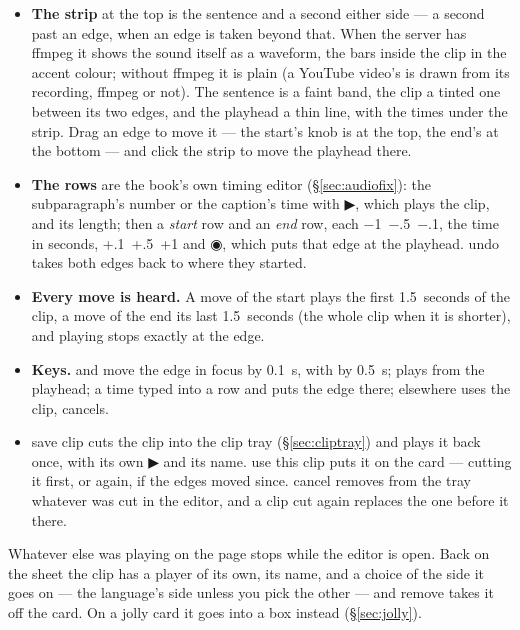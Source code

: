 \documentclass[11pt,oneside]{report}
\newcommand{\sym}[1]{{\symfont #1}}
\newcommand{\key}[1]{\textsf{\small\fbox{#1}}}
\newcommand{\menu}[1]{\textsf{#1}}
\begin{document}
\begin{itemize}
\item \textbf{The strip} at the top is the sentence and a second either
  side --- a second past an edge, when an edge is taken beyond that. When the
  server has ffmpeg it shows the sound itself as a waveform, the bars inside
  the clip in the accent colour; without ffmpeg it is plain (a YouTube
  video's is drawn from its recording, ffmpeg or not). The sentence is
  a faint band, the clip a tinted one between its two edges, and the
  playhead a thin line, with the times under the strip. Drag an edge to move
  it --- the start's knob is at the top, the end's at the bottom --- and
  click the strip to move the playhead there.
\item \textbf{The rows} are the book's own timing editor
  (\S\ref{sec:audiofix}): the subparagraph's number or the caption's time
  with \sym{▶}, which plays the clip, and its length; then a \emph{start}
  row and an \emph{end} row, each
  \menu{$-$1}~\menu{$-$.5}~\menu{$-$.1}, the time in seconds,
  \menu{+.1}~\menu{+.5}~\menu{+1} and \sym{◉}, which puts that edge at the
  playhead. \menu{undo} takes both edges back to where they started.
\item \textbf{Every move is heard.} A move of the start plays the first
  1.5~seconds of the clip, a move of the end its last 1.5~seconds (the whole
  clip when it is shorter), and playing stops exactly at the edge.
\item \textbf{Keys.} \key{$\leftarrow$} and \key{$\rightarrow$} move the
  edge in focus by 0.1~s, with \key{Shift} by 0.5~s; \key{Space} plays from
  the playhead; a time typed into a row and \key{Enter} puts the edge there;
  \key{Enter} elsewhere uses the clip, \key{Esc} cancels.
\item \menu{save clip} cuts the clip into the clip tray
  (\S\ref{sec:cliptray}) and plays it back once, with its own \sym{▶} and
  its name. \menu{use this clip} puts it on the card --- cutting it first,
  or again, if the edges moved since. \menu{cancel} removes from the tray
  whatever was cut in the editor, and a clip cut again replaces the one
  before it there.
\end{itemize}

Whatever else was playing on the page stops while the editor is open. Back
on the sheet the clip has a player of its own, its name, and a choice of the
side it goes on --- the language's side unless you pick the other ---
and \menu{remove} takes it off the card. On a jolly card it goes into a box
instead (\S\ref{sec:jolly}).
\end{document}
